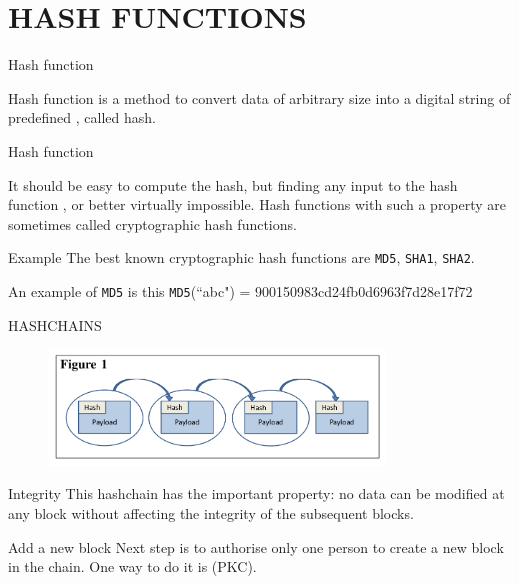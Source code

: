 \documentclass[serif]{beamer}
\begin{document}
\section{HASH FUNCTIONS}
\begin{frame}{Hash function}
	\begin{definition}
		Hash function is a method to convert data of arbitrary size
		into a digital string of predefined {\color{red}{fixed length}}, called hash.
	\end{definition}
\end{frame}
\begin{frame}{Hash function}
		\begin{definition}
			It should be easy to compute the hash, but finding any input to the hash
			function {\color{red}{must be difficult}}, or better virtually impossible. Hash functions with such a property are sometimes called
			cryptographic hash functions.
		\end{definition}
\end{frame}
\begin{frame}{Example}
	The best known cryptographic hash functions are
	{\tt MD5}, {\tt SHA1}, {\tt SHA2}. 
	\begin{example}
		An example of {\tt MD5} is this
		{\tt MD5}(``abc") = 900150983cd24fb0d6963f7d28e17f72
	\end{example}
\end{frame}

\begin{frame}{HASHCHAINS}
		\begin{figure}
		\includegraphics[width=0.8\textwidth]{hashch}
		\label{fig:hash}
	\end{figure}
	\begin{block}{Integrity}
		This hashchain has the important property: no data can be modified at any block
		without affecting the integrity of the subsequent blocks.
	\end{block}
	
	
\end{frame}

\begin{frame}{Add a new block}
	Next step is to authorise only one person to create a
	new block in the chain. One way to do it is {\color{red}{Public Key
	Cryptography}} (PKC).
\end{frame}
\end{document}
